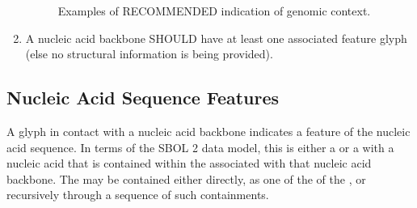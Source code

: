 \begin{enumerate}
	\begin{figure}[h!]
	\centering
	\caption{Examples of RECOMMENDED indication of genomic context.}
	\label{exa:1c}
	\end{figure}

\item A nucleic acid backbone SHOULD have at least one associated feature glyph (else no structural information is being provided).
\end{enumerate}


\subsection{Nucleic Acid Sequence Features}
\label{s:lang:nacomponent}

A glyph in contact with a nucleic acid backbone indicates a feature of the nucleic acid sequence.
% 
In terms of the SBOL 2 data model, this is either a  or a  with a nucleic acid  that is contained within the  associated with that nucleic acid backbone.
The  may be contained either directly, as one of the  of the , or recursively through a sequence of such containments.

